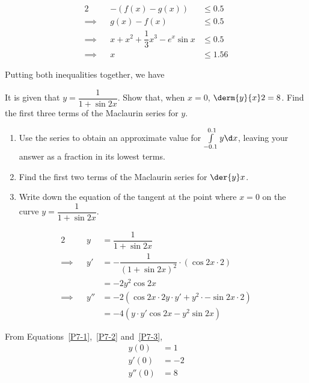 \documentclass{jhwhw}
\begin{document}
            \begin{alignat*}{2}
                &&-\left(f(x) - g(x)\right) &\leq 0.5\\
                \implies&&g(x) - f(x) &\leq 0.5\\
                \implies&&x + x^2 + \dfrac13 x^3 - e^x \sin x &\leq 0.5\\
                \implies&&x &\leq 1.56
            \end{alignat*}

            Putting both inequalities together, we have


    \problem{}
        It is given that $y = \dfrac1{1 + \sin 2x}$. Show that, when $x = 0$, $\derm{y}{x}2 = 8$. Find the first three terms of the Maclaurin series for $y$.

        \begin{enumerate}
            \item Use the series to obtain an approximate value for $\int\limits_{-0.1}^{0.1} y \d x$, leaving your answer as a fraction in its lowest terms.
            \item Find the first two terms of the Maclaurin series for $\der{y}x$.
            \item Write down the equation of the tangent at the point where $x = 0$ on the curve $y = \dfrac1{1 + \sin 2x}$.
        \end{enumerate}

    \solution
        \begin{alignat}{2}
            && y &= \dfrac1{1 + \sin 2x} \label{P7-1} \\
            \implies&&y' &= -\dfrac1{(1+\sin 2x)^2} \cdot (\cos 2x \cdot 2)\nonumber\\
            && &= -2 y^2\cos 2x \label{P7-2}\\
            \implies&&y'' &= -2 \left(\cos 2x \cdot 2y\cdot y' + y^2 \cdot -\sin 2x \cdot 2\right)\nonumber\\
            && &= -4\left(y\cdot y' \cos 2x - y^2\sin 2x  \right)\label{P7-3}
        \end{alignat}
        
        From Equations~\ref{P7-1},~\ref{P7-2} and~\ref{P7-3},
        \begin{align*}
            y(0) &= 1\\
            y'(0) &= -2\\
            y''(0) &= 8
        \end{align*}
\end{document}
